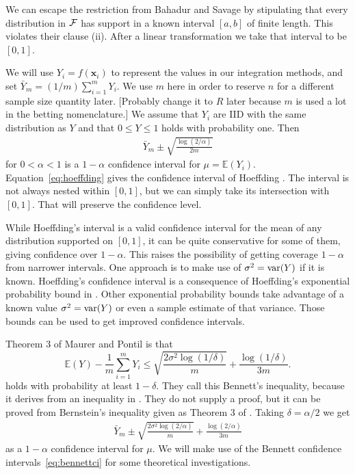 \documentclass{article}
\newcommand{\art}[1]{\begingroup\color{blue}#1\endgroup}
\renewcommand{\le}{\leqslant}
\newcommand{\e}{\mathbb{E}}
\newcommand{\bsx}{\boldsymbol{x}}
\begin{document}
We can escape the restriction from Bahadur and
Savage by stipulating that every distribution in $\mathcal{F}$
has support in a known interval $[a,b]$ of finite length.
This violates their clause (ii).
After a linear transformation we take that interval
to be $[0,1]$.

We will use $Y_i = f(\bsx_i)$ to represent 
the values in our integration methods, and 
set $\bar Y_m = (1/m)\sum_{i=1}^mY_i$.  
We use $m$ here in order to reserve $n$ for a
different sample size quantity later.
\art{[Probably change it to $R$ later because $m$ is
used a lot in the betting nomenclature.]}
We assume that $Y_i$ are IID with the same
distribution as $Y$ and that
$0\le Y\le1$ holds with probability one.
Then
\begin{align}\label{eq:hoeffding}
\bar Y_m \pm \sqrt{\frac{\log(2/\alpha)}{2m}}
\end{align}
for $0<\alpha<1$ is a $1-\alpha$ confidence interval for $\mu=\e(Y_i)$.  Equation~\eqref{eq:hoeffding} gives
the confidence interval of Hoeffding \cite{hoef:1963}.  The interval is not always
nested within $[0,1]$, but we can simply take its
intersection with $[0,1]$. That will preserve the confidence level.

While Hoeffding's interval is a valid confidence interval
for the mean of any distribution supported on $[0,1]$,
it can be quite conservative for some
of them, giving confidence over $1-\alpha$. This raises
the possibility of getting coverage $1-\alpha$ from
narrower intervals.  
One approach is to make use of 
$\sigma^2=\operatorname{var}(Y)$ if it is known. 
Hoeffding's confidence interval is a consequence of
Hoeffding's exponential probability bound in \cite{hoef:1963}.
Other exponential probability bounds take advantage of
a known value $\sigma^2=\operatorname{var}(Y)$ or even a sample estimate
of that variance.  Those bounds can be used to get
improved confidence intervals.

Theorem 3 of Maurer and Pontil \cite{maurer2009empirical}
is that
$$
\e(Y) - \frac1m\sum_{i=1}^mY_i \le \sqrt{\frac{2\sigma^2\log(1/\delta)}m}
+ \frac{\log(1/\delta)}{3m}.
  $$
holds with probability at least $1-\delta$.
They call this Bennett's inequality, because it derives
from an inequality in \cite{benn:1962}. 
\art{They do not supply a proof, but it can be proved from Bernstein's
inequality given as Theorem 3 of \cite{bouc:lugo:bous:2003}.}
Taking $\delta =\alpha/2$ we get
\begin{align}\label{eq:bennettci}
\bar Y_m \pm \sqrt{\frac{2\sigma^2\log(2/\alpha)}m}
+ \frac{\log(2/\alpha)}{3m}
\end{align}
as a $1-\alpha$ confidence interval for $\mu$.
We will make use of the Bennett confidence
intervals~\eqref{eq:bennettci} for some
theoretical investigations. 
\end{document}
